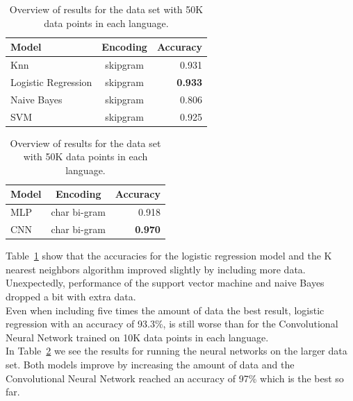 \begin{table}
  \centering
  \begin{tabular}{ l  c | r }
    \hline
    Model               & Encoding & Accuracy \\
    \hline
    Knn                 & skipgram & 0.931\\
    Logistic Regression & skipgram  & \textbf{0.933}\\
    Naive Bayes         & skipgram  & 0.806\\
    SVM                 & skipgram& 0.925\\
    \hline
  \end{tabular}
  \caption{Overview of results for the data set with 50K data points in each language.}
  \label{results-sklearn300k}
\end{table}


\begin{table}
  \centering
  \begin{tabular}{ l c | r }
    \hline
    Model               & Encoding & Accuracy \\
    \hline
    MLP                 & char bi-gram  & 0.918\\
    CNN                 & char bi-gram  & \textbf{0.970}\\
    \hline
  \end{tabular}
  \caption{Overview of results for the data set with 50K data points in each language.}
  \label{results-keras-300k}
\end{table}

Table~\ref{results-sklearn300k} show that the accuracies for the logistic regression model and the K nearest neighbors algorithm improved slightly by including more data. Unexpectedly, performance of the support vector machine and naive Bayes dropped a bit with extra data.\\

Even when including five times the amount of data the best result, logistic regression with an accuracy of 93.3\%, is still worse than for the Convolutional Neural Network trained on 10K data points in each language.\\

In Table~\ref{results-keras-300k} we see the results for running the neural networks on the larger data set. Both models improve by increasing the amount of data and the Convolutional Neural Network reached an accuracy of 97\% which is the best so far.\\


